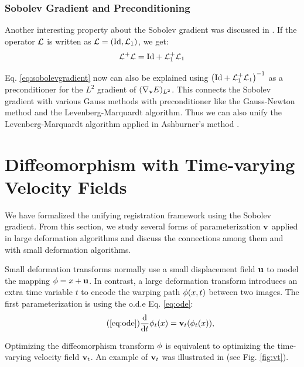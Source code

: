 \documentclass[letterpaper,12pt]{article}
\begin{document}
\subsubsection{Sobolev Gradient and Preconditioning}
\label{sec:sobolevprecondition}

Another interesting property about the Sobolev gradient was discussed in \cite{Zikic2010}. If the operator $\mathcal{L}$ is written as $\mathcal{L} = (\text{Id}, \mathcal{L}_1)$, we get:
\begin{align}
\mathcal{L}^+\mathcal{L} = \text{Id} + \mathcal{L}_1^+ \mathcal{L}_1
\end{align}

Eq. \ref{eq:sobolevgradient} now can also be explained using $\left(
  \text{Id} + \mathcal{L}_1^+ \mathcal{L}_1 \right)^{-1}$ as a preconditioner for the
$L^2$ gradient of $(\nabla_{\mathbf{v}}E)_{L^2}$. This connects the Sobolev
gradient with various Gauss methods with preconditioner like the
Gauss-Newton method and the Levenberg-Marquardt algorithm. Thus we can also unify the Levenberg-Marquardt algorithm applied in Ashburner's method \cite{Ashburner2007}.


\section{Diffeomorphism with Time-varying Velocity Fields}
\label{sec:lddmm}

We have formalized the unifying registration framework using the Sobolev gradient. From this section, we study several forms of parameterization $\mathbf{v}$ applied in large deformation algorithms and discuss the connections among them and with small deformation algorithms.

Small deformation transforms normally use a small displacement field $\mathbf{u}$ to model the mapping $\phi = x + \mathbf{u}$. In contrast, a large deformation transform introduces an extra time variable $t$ to encode the warping path $\phi(x,t)$ between two images. The first parameterization is using the o.d.e Eq. \ref{eq:ode}:
\begin{align}
\tag{\ref{eq:ode}}
\frac{\dd}{\dd t} \myphi_t(x) = \v_t(\myphi_t(x)), 
\end{align}

Optimizing the diffeomorphism transform $\phi$ is equivalent to optimizing the time-varying velocity field $\mathbf{v}_t$. An example of $\mathbf{v}_t$ was illustrated in \cite{Beg2005Computing} (see Fig. \ref{fig:vt}).
\end{document}
